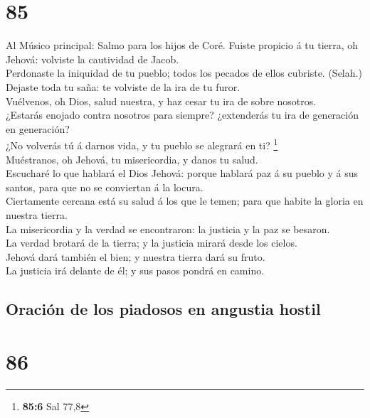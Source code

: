 \hypertarget{section-84}{%
\section{85}\label{section-84}}

 Al Músico principal: Salmo para los hijos de Coré. Fuiste
propicio á tu tierra, oh Jehová: volviste la cautividad de Jacob.\\
 Perdonaste la iniquidad de tu pueblo; todos los pecados de
ellos cubriste. (Selah.)\\
 Dejaste toda tu saña: te volviste de la ira de tu furor.\\
 Vuélvenos, oh Dios, salud nuestra, y haz cesar tu ira de
sobre nosotros.\\
 ¿Estarás enojado contra nosotros para siempre? ¿extenderás
tu ira de generación en generación?\\
 ¿No volverás tú á darnos vida, y tu pueblo se alegrará en
ti? \footnote{\textbf{85:6} Sal 77,8}\\
 Muéstranos, oh Jehová, tu misericordia, y danos tu salud.\\
 Escucharé lo que hablará el Dios Jehová: porque hablará paz
á su pueblo y á sus santos, para que no se conviertan á la locura.\\
 Ciertamente cercana está su salud á los que le temen; para
que habite la gloria en nuestra tierra.\\
 La misericordia y la verdad se encontraron: la justicia y
la paz se besaron.\\
 La verdad brotará de la tierra; y la justicia mirará desde
los cielos.\\
 Jehová dará también el bien; y nuestra tierra dará su
fruto.\\
 La justicia irá delante de él; y sus pasos pondrá en
camino.

\hypertarget{oraciuxf3n-de-los-piadosos-en-angustia-hostil}{%
\subsection{Oración de los piadosos en angustia
hostil}\label{oraciuxf3n-de-los-piadosos-en-angustia-hostil}}

\hypertarget{section-85}{%
\section{86}\label{section-85}}

